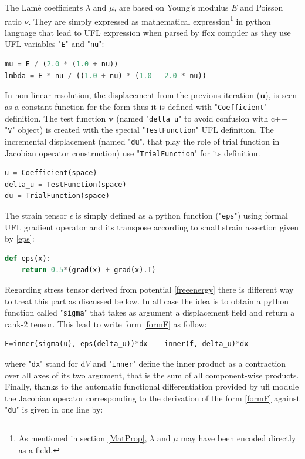 \documentclass[12pt]{article}
\newcommand{\vm}[1]{
	{\ensuremath{\mathbf{#1}}}
}
\newcommand{\tens}[1]{
	{\ensuremath{\mathsf{#1}}}
}
\newcommand{\mycode}[1]{\textsf{"}\lstinline`#1`\textsf{"}}
\newcommand{\mycodepy}[1]{\textsf{"}\lstinline[language=Python]`#1`\textsf{"}}
\begin{document}
The Lamè coefficients $\lambda$ and $\mu$, are based on Young's modulus $E$ and Poisson ratio $\nu$.
They are simply expressed as mathematical expression\footnote{As mentioned in section \ref{MatProp}, $\lambda$ and $\mu$ may have been encoded directly as a field.} in python language that lead to UFL expression when parsed by ffcx compiler as they use UFL variables \mycodepy{E} and \mycodepy{nu}:
\begin{lstlisting}[numbers=none,basicstyle=\footnotesize,language=Python,label=lamecoefpy]
mu = E / (2.0 * (1.0 + nu))
lmbda = E * nu / ((1.0 + nu) * (1.0 - 2.0 * nu))
\end{lstlisting}
In non-linear resolution, the displacement from the previous iteration ($\vm{u}$), is seen  as a constant function for the form thus it is defined with \mycodepy{Coefficient} definition. The test function $\vm{v}$ (named \mycodepy{delta_u} to avoid confusion with c++ \mycode{V} object) is created with the special \mycodepy{TestFunction} UFL definition. The incremental displacement  (named \mycodepy{du}, that play the role of trial function in Jacobian operator construction)   use \mycodepy{TrialFunction} for its definition.
\begin{lstlisting}[numbers=none,basicstyle=\footnotesize,language=Python]
u = Coefficient(space)
delta_u = TestFunction(space)
du = TrialFunction(space)
\end{lstlisting}
The strain tensor $\tens{\epsilon}$ is simply defined as a python function (\mycodepy{eps}) using formal UFL gradient operator and its transpose according to small strain assertion given by \eqref{eps}:


\begin{lstlisting}[numbers=none,basicstyle=\footnotesize,language=Python]
def eps(x):
	return 0.5*(grad(x) + grad(x).T)
\end{lstlisting}

Regarding stress tensor derived from potential \eqref{freeenergy} there is different way to treat this part as discussed bellow.
In all case the idea is to obtain a python function called \mycodepy{sigma} that takes as argument a displacement field and return a rank-2 tensor. This lead to write form \ref{formF} as follow:
\begin{lstlisting}[numbers=none,basicstyle=\footnotesize,language=python,label=Ffenicsxpy]
F=inner(sigma(u), eps(delta_u))*dx -  inner(f, delta_u)*dx 
\end{lstlisting}
where  \mycodepy{dx} stand for $\mathrm{d}V$ and \mycodepy{inner} define the inner product as a contraction over all axes of its two argument, that is the sum of all component-wise products.
Finally, thanks to the automatic functional differentiation provided by ufl module the Jacobian operator corresponding to the  derivation of the form \eqref{formF} against \mycodepy{du} is given in one line by:
 
\end{document}
